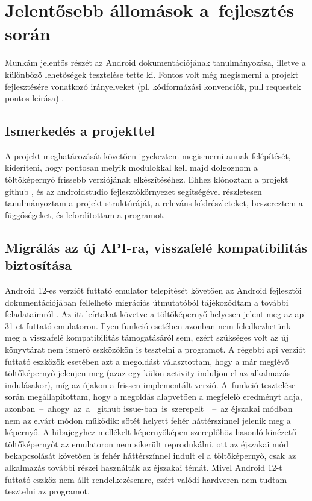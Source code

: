 \chapter{Jelentősebb állomások a~fejlesztés során}
Munkám jelentős részét az Android dokumentációjának tanulmányozása, illetve a különböző lehetőségek
tesztelése tette ki. Fontos volt még megismerni a projekt fejlesztésére vonatkozó irányelveket
(pl. kódformázási konvenciók, pull requestek pontos leírása) \cite{guidelines}.

\section{Ismerkedés a projekttel}
A projekt meghatározását követően igyekeztem megismerni annak felépítését, kideríteni, hogy
pontosan melyik modulokkal kell majd dolgoznom a töltőképernyő frissebb verziójának elkészítéséhez.
Ehhez klónoztam a projekt \gls{github} , és az \gls{androidstudio} fejlesztőkörnyezet
segítségével részletesen tanulmányoztam a projekt struktúráját, a releváns kódrészleteket,
beszereztem a függőségeket, és lefordítottam a programot.

\section{Migrálás az új API-ra, visszafelé kompatibilitás biztosítása}
Android 12-es verziót futtató \gls{emulator} telepítését követően az Android fejlesztői
dokumentációjában fellelhető migrációs útmutatóból tájékozódtam a további feladataimról \cite{splashscreenmigration}.
Az itt leírtakat követve a töltőképernyő helyesen jelent meg az \acrshort{api} 31-et futtató \gls{emulator}on.
Ilyen funkció esetében azonban nem feledkezhetünk meg a visszafelé kompatibilitás támogatásáról
sem, ezért szükséges volt az új könyvtárat nem ismerő eszközökön is tesztelni a programot.
A régebbi \acrshort{api} verziót futtató eszközök esetében azt a megoldást választottam, hogy a már meglévő
töltőképernyő jelenjen meg (azaz egy külön  \gls{activity} induljon el az alkalmazás
indulásakor), míg az újakon a frissen implementált verzió. A~funkció tesztelése során
megállapítottam, hogy a megoldás alapvetően a megfelelő eredményt adja, azonban~--~ahogy~az~a~
\gls{github} issue-ban~is~\mbox{szerepelt}~\cite{issue}~--~az éjszakai módban nem az elvárt módon működik: sötét helyett
fehér háttérszínnel jelenik meg a képernyő. A hibajegyhez mellékelt képernyőképen szereplőhöz
hasonló kinézetű töltőképernyőt az \gls{emulator}on nem sikerült reprodukálni, ott az éjszakai mód
bekapcsolását követően is fehér háttérszínnel indult el a töltőképernyő, csak az alkalmazás
további részei használták az éjszakai témát. Mivel Android 12-t futtató eszköz nem állt
rendelkezésemre, ezért valódi hardveren nem tudtam tesztelni az programot.

